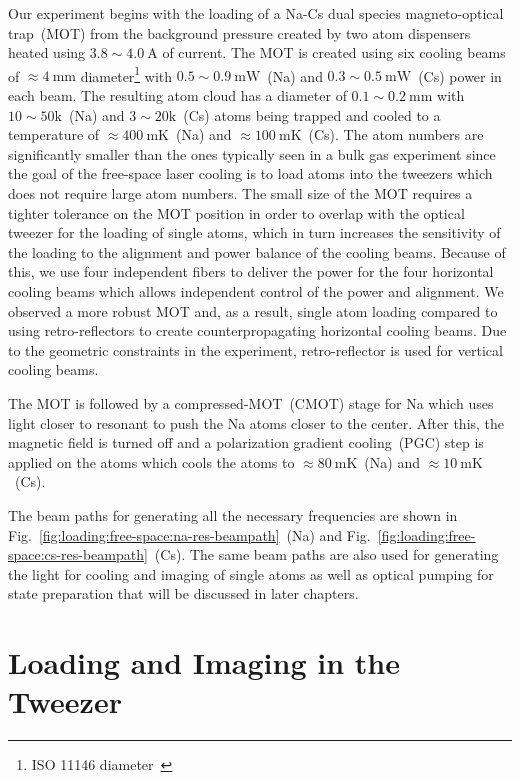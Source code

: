 Our experiment begins with the loading of a Na-Cs dual species magneto-optical trap~(MOT)
from the background pressure created by two atom dispensers
heated using $3.8\sim4.0~\mathrm{A}$ of current.
The MOT is created using six cooling beams of $\approx\!4~\mathrm{mm}$ diameter\footnote{
  ISO 11146 diameter~\cite{isotc_172sc_9_iso_2005,dataray_inc_wincamd_2018}}
with $0.5\sim0.9~\mathrm{mW}$~(Na) and $0.3\sim0.5~\mathrm{mW}$~(Cs)
power in each beam.
The resulting atom cloud has a diameter of $0.1\sim0.2~\mathrm{mm}$
with $10\sim50\mathrm{k}$~(Na) and $3\sim20\mathrm{k}$~(Cs) atoms being trapped
and cooled to a temperature of $\approx\!400~\mathrm{mK}$~(Na)
and $\approx\!100~\mathrm{mK}$~(Cs).
The atom numbers are significantly smaller than the ones typically seen in a bulk gas experiment
since the goal of the free-space laser cooling is to load atoms into the tweezers
which does not require large atom numbers.
The small size of the MOT requires a tighter tolerance on the MOT position
in order to overlap with the optical tweezer for the loading of single atoms,
which in turn increases the sensitivity of the loading to the alignment
and power balance of the cooling beams.
Because of this, we use four independent fibers to deliver the power
for the four horizontal cooling beams which allows independent control
of the power and alignment.
We observed a more robust MOT and, as a result, single atom loading
compared to using retro-reflectors to create counterpropagating horizontal cooling beams.
Due to the geometric constraints in the experiment,
retro-reflector is used for vertical cooling beams.

The MOT is followed by a compressed-MOT~(CMOT) stage for Na
which uses light closer to resonant to push the Na atoms closer to the center.
After this, the magnetic field is turned off and
a polarization gradient cooling~(PGC) step is applied on the atoms
which cools the atoms to $\approx\!80~\mathrm{mK}$~(Na)
and $\approx\!10~\mathrm{mK}$~(Cs).

The beam paths for generating all the necessary frequencies are shown in
Fig.~\ref{fig:loading:free-space:na-res-beampath}~(Na) and
Fig.~\ref{fig:loading:free-space:cs-res-beampath}~(Cs).
The same beam paths are also used for generating the light for cooling
and imaging of single atoms as well as optical pumping for state preparation
that will be discussed in later chapters.

\section{Loading and Imaging in the Tweezer}
\label{ch:loading:loading}

